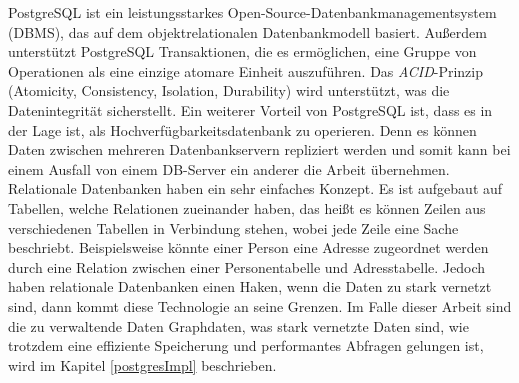 PostgreSQL ist ein leistungsstarkes Open-Source-Datenbankmanagementsystem (DBMS), das auf dem objektrelationalen Datenbankmodell basiert. Außerdem unterstützt PostgreSQL Transaktionen, die es ermöglichen, eine Gruppe von Operationen als eine einzige atomare Einheit auszuführen. Das \emph{ACID}-Prinzip (Atomicity, Consistency, Isolation, Durability) wird unterstützt, was die Datenintegrität sicherstellt. Ein weiterer Vorteil von PostgreSQL ist, dass es in der Lage ist, als Hochverfügbarkeitsdatenbank zu operieren. Denn es können Daten zwischen mehreren Datenbankservern repliziert werden und somit kann bei einem Ausfall von einem DB-Server ein anderer die Arbeit übernehmen. 
Relationale Datenbanken haben ein sehr einfaches Konzept. Es ist aufgebaut auf Tabellen, welche Relationen zueinander haben, das heißt es können Zeilen aus verschiedenen Tabellen in Verbindung stehen, wobei jede Zeile eine Sache beschriebt. Beispielsweise könnte einer Person eine Adresse zugeordnet werden durch eine Relation zwischen einer Personentabelle und Adresstabelle. Jedoch haben relationale Datenbanken einen Haken, wenn die Daten zu stark vernetzt sind, dann kommt diese Technologie an seine Grenzen. Im Falle dieser Arbeit sind die zu verwaltende Daten Graphdaten, was stark vernetzte Daten sind, wie trotzdem eine effiziente Speicherung und performantes Abfragen gelungen ist, wird im Kapitel \ref{postgresImpl} beschrieben.  \cite{postgreSQLDocs, FireshipPostgreSQL}